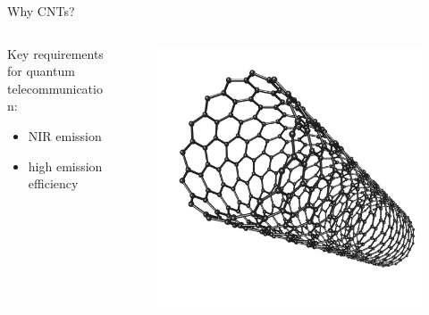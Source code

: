 \documentclass[xcolor = {dvipsnames}]{beamer}
\begin{document}
\begin{frame}{Why CNTs?}
\begin{columns}

\begin{column}{0.6\textwidth}
Key requirements for quantum telecommunication:
\begin{itemize}
\item NIR emission
\item high emission efficiency
\end{itemize}
\end{column}

\begin{column}{0.4\textwidth}
 \begin{figure}
    \begin{overprint}
     \centering\includegraphics[width=1\textwidth]{images/CNT}

\end{overprint}
\end{figure}
\end{column}
\end{columns}
\end{frame}
\end{document}
